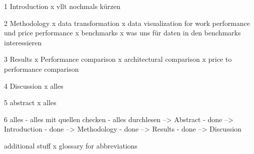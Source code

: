 1 Introduction
x vllt nochmals kürzen

2 Methodology
x data transformation
x data visualization for work performance und price performance
x benchmarks
x was uns für daten in den benchmarks interessieren

3 Results
x Performance comparison
x architectural comparison
x price to performance comparison

4 Discussion
x alles

5 abstract
x alles

6 alles
- alles mit quellen checken
- alles durchlesen
--> Abstract - done
--> Introduction - done
--> Methodology - done
--> Results - done
--> Discussion

additional stuff
x glossary for abbreviations